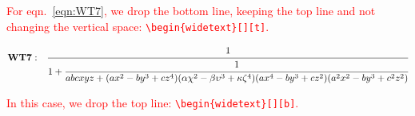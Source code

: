 \lipsum[34-37]

\begin{table}[b]
\caption{\label{tab:3}Table at full column width with columns in math mode}
\end{table}

\lipsum[40-54]

\textcolor{red}{For eqn.~\eqref{eqn:WT7}, we drop the bottom line, keeping the top line and not changing the vertical space: \texttt{\textbackslash begin\{widetext\}[][t]}.}
\begin{widetext}[][t]
\begin{equation}\label{eqn:WT7}%
\mathbf{WT7:}\quad
\cfrac{1}{1+ \cfrac{1}{abcxyz+(ax^2-by^3+cz^4)(\alpha\chi^2-\beta\upsilon^3+\kappa\zeta^4)(ax^4-by^3+cz^2)(a^2x^2-by^3+c^2z^2)}}
\end{equation}
\end{widetext}
\lipsum[50-63]

\textcolor{red}{In this case, we drop the top line: \texttt{\textbackslash begin\{widetext\}[][b]}.}

\vskip 80pt%

